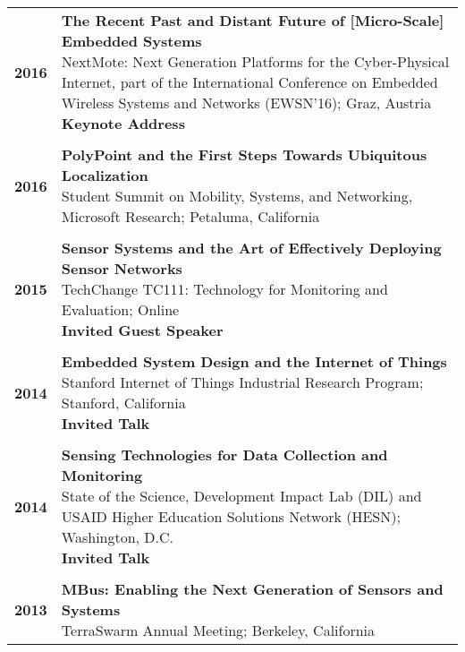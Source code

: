 \documentclass{article}
\begin{document}
\begin{longtable}{>{\bf}p{1cm} l}
  2016 & \makecell{
    \textbf{The Recent Past and Distant Future of [Micro-Scale] Embedded Systems} \\
    NextMote: Next Generation Platforms for the Cyber-Physical Internet, part of the International Conference on Embedded Wireless Systems and Networks (EWSN'16); Graz, Austria \\
    \textbf{\color{BrickRed} Keynote Address} \\
  } \\

  \\

  2016 & \makecell{
    \textbf{PolyPoint and the First Steps Towards Ubiquitous Localization} \\
    Student Summit on Mobility, Systems, and Networking, Microsoft Research; Petaluma, California \\
  } \\

  \\

  2015 & \makecell{
    \textbf{Sensor Systems and the Art of Effectively Deploying Sensor Networks} \\
    TechChange TC111: Technology for Monitoring and Evaluation; Online \\
    \textbf{\color{BrickRed} Invited Guest Speaker} \\
  } \\

  \\

  2014 & \makecell{
    \textbf{Embedded System Design and the Internet of Things} \\
    Stanford Internet of Things Industrial Research Program; Stanford, California \\
    \textbf{\color{BrickRed} Invited Talk} \\
  } \\

  \\

  2014 & \makecell{
    \textbf{Sensing Technologies for Data Collection and Monitoring} \\
    State of the Science, Development Impact Lab (DIL) and USAID Higher Education Solutions Network (HESN); Washington, D.C. \\
    \textbf{\color{BrickRed} Invited Talk} \\
  } \\

  \\

  2013 & \makecell{
    \textbf{MBus: Enabling the Next Generation of Sensors and Systems} \\
    TerraSwarm Annual Meeting; Berkeley, California \\
  } \\
\end{longtable}
\end{document}
